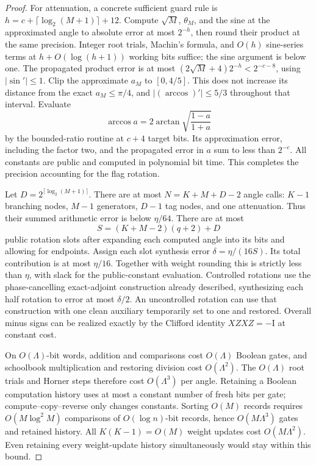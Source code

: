 \documentclass[11pt]{article}
\theoremstyle{definition}
\newcommand{\Id}{\mathrm I}
\DeclareMathOperator{\atan}{arctan}
\begin{document}
\begin{proof}
For attenuation, a concrete sufficient guard rule is
$h=c+\lceil\log_2(M+1)\rceil+12$. Compute $\sqrt M$, $\theta_M$, and
the sine at the approximated angle to absolute error at most $2^{-h}$,
then round their product at the same precision. Integer root trials,
Machin's formula, and $O(h)$ sine-series terms at
$h+O(\log(h+1))$ working bits suffice; the sine argument is below one.
The propagated product error is at most
$(2\sqrt M+4)2^{-h}<2^{-c-8}$, using $|\sin'|\le1$.
Clip the approximate $a_M$ to $[0,4/5]$. This does not increase its
distance from the exact $a_M\le\pi/4$, and
$|(\arccos)'|\le5/3$ throughout that interval. Evaluate
\[
 \arccos a=2\atan\sqrt{\frac{1-a}{1+a}}
\]
by the bounded-ratio routine at $c+4$ target bits. Its approximation error,
including the factor two, and the propagated error in $a$ sum to less
than $2^{-c}$. All constants are public and computed in polynomial bit
time. This completes the precision accounting for the flag rotation.

Let $D=2^{\lceil\log_2(M+1)\rceil}$. There are at most
$N=K+M+D-2$ angle calls: $K-1$ branching nodes, $M-1$ generators,
$D-1$ tag nodes, and one attenuation. Thus their summed arithmetic error
is below $\eta/64$. There are at most
\[
 S=(K+M-2)(q+2)+D
\]
public rotation slots after expanding each computed angle into its bits
and allowing for endpoints. Assign each slot synthesis error
$\delta=\eta/(16S)$. Its total contribution is at most $\eta/16$.
Together with weight rounding this is strictly less than $\eta$, with
slack for the public-constant evaluation. Controlled rotations use the
phase-cancelling exact-adjoint construction already described, synthesizing
each half rotation to error at most $\delta/2$. An
uncontrolled rotation can use that construction with one clean auxiliary
temporarily set to one and restored. Overall minus signs can be realized
exactly by the Clifford identity $XZXZ=-\Id$ at constant cost.

On $O(\Lambda)$-bit words, addition and comparisons cost $O(\Lambda)$
Boolean gates, and schoolbook multiplication and restoring division cost
$O(\Lambda^2)$. The $O(\Lambda)$ root trials and Horner steps therefore
cost $O(\Lambda^3)$ per angle. Retaining a Boolean computation history
uses at most a constant number of fresh bits per gate; compute--copy--reverse
only changes constants. Sorting $O(M)$ records requires
$O(M\log^2 M)$ comparisons of $O(\log n)$-bit records, hence
$O(M\Lambda^3)$ gates and retained history. All $K(K-1)=O(M)$ weight
updates cost $O(M\Lambda^2)$. Even retaining every weight-update history
simultaneously would stay within this bound.


\end{proof}
\end{document}
